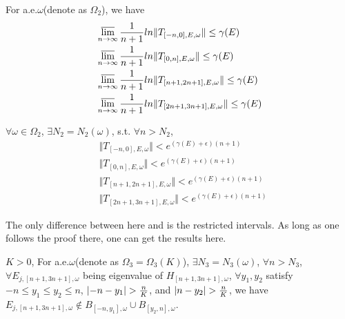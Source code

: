 \begin{thm}
  For a.e.$\omega$(denote as $\Omega_2$), we have
  \[
    \begin{aligned}
      &\varlimsup_{n\to\infty} \frac{1}{n+1} ln\Vert T_{[-n,0],E,\omega}\Vert\leq\gamma(E)\\
      &\varlimsup_{n\to\infty} \frac{1}{n+1} ln\Vert T_{[0,n],E,\omega}\Vert\leq\gamma(E)\\
      &\varlimsup_{n\to\infty} \frac{1}{n+1} ln\Vert T_{[n+1,2n+1],E,\omega}\Vert\leq\gamma(E)\\
      &\varlimsup_{n\to\infty} \frac{1}{n+1} ln\Vert T_{[2n+1,3n+1],E,\omega}\Vert\leq\gamma(E)
    \end{aligned}
  \]
\end{thm}
\begin{cor}
  $\forall \omega\in\Omega_2$, $\exists N_2=N_2(\omega)$, s.t. $\forall n>N_2$,
  \[
    \begin{aligned}
      &\Vert T_{[-n,0],E,\omega}\Vert< e^{(\gamma(E)+\epsilon)(n+1)}\\
      &\Vert T_{[0,n],E,\omega}\Vert< e^{(\gamma(E)+\epsilon)(n+1)}\\
      &\Vert T_{[n+1,2n+1],E,\omega}\Vert< e^{(\gamma(E)+\epsilon)(n+1)}\\
      &\Vert T_{[2n+1,3n+1],E,\omega}\Vert< e^{(\gamma(E)+\epsilon)(n+1)}
    \end{aligned}
  \]
\end{cor}
\begin{remark}
  The only difference between here and \cite{craig1983subharmonicity} is the restricted intervals. As long as one follows the proof there, one can get the results here.
\end{remark}
\begin{thm}
   $K>0$, For a.e.$\omega$(denote as $\Omega_3=\Omega_3(K)$), $\exists N_3=N_3(\omega)$, $\forall n>N_3$, $\forall E_{j,[n+1,3n+1],\omega}$ being eigenvalue of $H_{[n+1,3n+1],\omega}$, $\forall y_1,y_2$ satisfy $-n\leq y_1\leq y_2\leq n$,  $\lvert-n-y_1\rvert>\frac{n}{K}$, and $\lvert n-y_2\rvert>\frac{n}{K}$,
 we have $E_{j,[n+1,3n+1],\omega}\notin B_{[-n,y_1],\omega}\cup B_{[y_2,n],\omega}$.
\end{thm}

